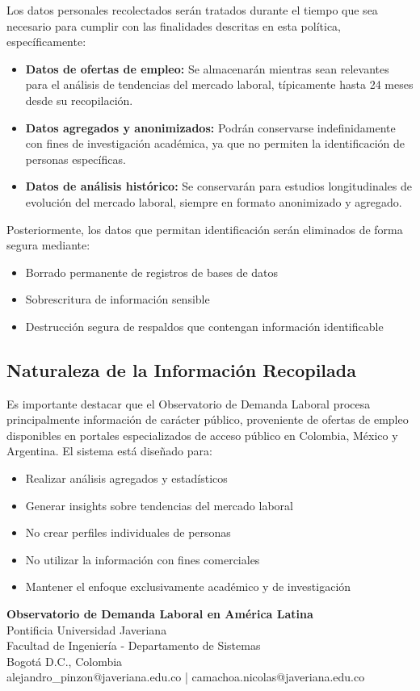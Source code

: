 \documentclass[11pt,oneside,letterpaper]{article}
\begin{document}
Los datos personales recolectados serán tratados durante el tiempo que sea necesario para cumplir con las finalidades descritas en esta política, específicamente:

\begin{itemize}
    \item \textbf{Datos de ofertas de empleo:} Se almacenarán mientras sean relevantes para el análisis de tendencias del mercado laboral, típicamente hasta 24 meses desde su recopilación.
    \item \textbf{Datos agregados y anonimizados:} Podrán conservarse indefinidamente con fines de investigación académica, ya que no permiten la identificación de personas específicas.
    \item \textbf{Datos de análisis histórico:} Se conservarán para estudios longitudinales de evolución del mercado laboral, siempre en formato anonimizado y agregado.
\end{itemize}

Posteriormente, los datos que permitan identificación serán eliminados de forma segura mediante:

\begin{itemize}
    \item Borrado permanente de registros de bases de datos
    \item Sobrescritura de información sensible
    \item Destrucción segura de respaldos que contengan información identificable
\end{itemize}

\subsection{Naturaleza de la Información Recopilada}

Es importante destacar que el Observatorio de Demanda Laboral procesa principalmente información de carácter público, proveniente de ofertas de empleo disponibles en portales especializados de acceso público en Colombia, México y Argentina. El sistema está diseñado para:

\begin{itemize}
    \item Realizar análisis agregados y estadísticos
    \item Generar insights sobre tendencias del mercado laboral
    \item No crear perfiles individuales de personas
    \item No utilizar la información con fines comerciales
    \item Mantener el enfoque exclusivamente académico y de investigación
\end{itemize}

\vfill

\begin{center}
\textbf{Observatorio de Demanda Laboral en América Latina}\\
Pontificia Universidad Javeriana\\
Facultad de Ingeniería - Departamento de Sistemas\\
Bogotá D.C., Colombia\\
\vspace{0.3cm}
alejandro\_pinzon@javeriana.edu.co | camachoa.nicolas@javeriana.edu.co
\end{center}
\end{document}
